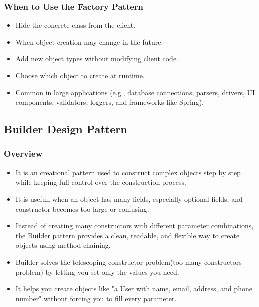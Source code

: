 \documentclass[11pt]{article}
\begin{document}
\subsubsection{When to Use the Factory Pattern}
\label{sec:org2386e64}

\begin{itemize}
\item Hide the concrete class from the client.
\item When object creation may change in the future.
\item Add new object types without modifying client code.
\item Choose which object to create at runtime.
\item Common in large applications (e.g., database connections, parsers, drivers, UI components, validators, loggers, and frameworks like Spring).
\end{itemize}
\subsection{Builder Design Pattern}
\label{sec:orgc6bebdd}
\subsubsection{Overview}
\label{sec:org6454927}
\begin{itemize}
\item It is an creational pattern used to construct complex objects step by step while keeping full control over the construction process.
\item It is usefull when an object has many fields, especially optional fields, and constructor becomes too large or confusing.
\item Instead of creating many constructors with different parameter combinations, the Builder pattern provides a clean, readable, and flexible way to create objects using method chaining.
\item Builder solves the telescoping constructor problem(too many constructors problem) by letting you set only the values you need.
\item It helps you create objects like "a User with name, email, address, and phone number" without forcing you to fill every parameter.
\end{itemize}
\end{document}
